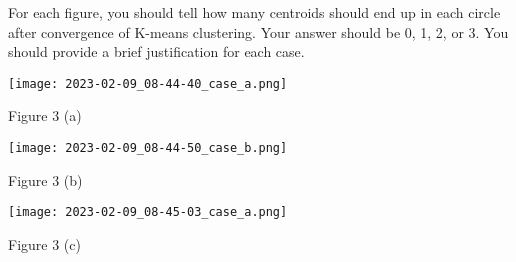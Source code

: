 \documentclass[11pt]{article}
\begin{document}
\begin{itemize}
For each figure, you should tell how many centroids should end up in each circle after convergence of K-means clustering. Your answer should be 0, 1, 2, or 3. You should provide a brief justification for each case.
\begin{center}
\texttt{[image: 2023-02-09\_08-44-40\_case\_a.png]}
  \begin{center} Figure 3 (a) \end{center}
\end{center}

\begin{center}
\texttt{[image: 2023-02-09\_08-44-50\_case\_b.png]}
  \begin{center} Figure 3 (b) \end{center}
\end{center}

\begin{center}
\texttt{[image: 2023-02-09\_08-45-03\_case\_a.png]}
  \begin{center} Figure 3 (c) \end{center}
\end{center}


\end{itemize}
\end{document}

